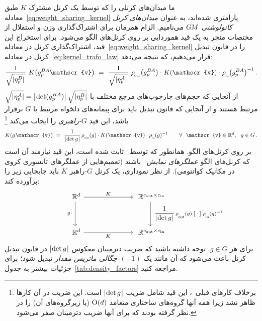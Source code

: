 ما میدان‌های کرنلی را که توسط یک کرنل مشترک $K$ طبق معادله~\eqref{eq:weight_sharing_kernel} پارامتری شده‌اند، به عنوان \emph{میدان‌های کرنل کانولوشنی} $G\mkern-1.4muM$ می‌نامیم.
الزام همزمان برای اشتراک‌گذاری وزن و استقلال از مختصات منجر به یک قید هموردایی بر روی کرنل‌های الگو می‌شود.
برای استخراج این قید، اشتراک‌گذاری کرنل در معادله~\eqref{eq:weight_sharing_kernel} را در قانون تبدیل کرنل در معادله~\eqref{eq:kernel_trafo_law} قرار می‌دهیم، که نتیجه می‌دهد:
\begin{align}
	\frac{1}{\sqrt{|\eta_p^B|\,}}\ K\big(g_p^{BA} \mathscr{v}\big)
	\ =\ 
	\frac{1}{\sqrt{|\eta_p^A|\,}}\ 
	\rhoout\big(g_p^{BA}\big) \cdot\mkern1mu 
	K(\mathscr{v})
	\mkern1mu\cdot \rhoin\big(g_p^{BA}\big)^{-1} \,.
\end{align}
از آنجایی که حجم‌های چارچوب‌های مرجع مختلف با
$\sqrt{|\eta_p^A|} = \big|\mkern-2mu \det(g_p^{BA})\big|\, \sqrt{|\eta_p^B|}$
مرتبط هستند و از آنجایی که قانون تبدیل باید برای پیمانه‌های دلخواه مرتبط با $G$ برقرار باشد، این قید \emph{$G$-راهبری} را ایجاب می‌کند%
\footnote{
	برخلاف کارهای قبلی~\cite{3d_steerableCNNs,Weiler2019_E2CNN,gaugeIco2019,kicanaoglu2019gaugeSphere,deHaan2020meshCNNs}، این قید شامل ضریب $|\mkern-2mu \det g \mkern1mu|$ است.
	این ضریب در آن کارها ظاهر نشد زیرا همه آنها گروه‌های ساختاری متعامد $\operatorname{O}(d)$ (یا زیرگروه‌های آن) را در نظر گرفته بودند که برای آنها ضریب دترمینان صفر می‌شود.
}
\begin{align}\label{eq:kernel_constraint}
	K(g\mkern1.5mu \mathscr{v})\ = \ \frac{1}{\detg}\, \rhoout(g) \cdot K(\mathscr{v}) \cdot \rhoin(g)^{-1}
	\qquad \forall\ \ \mathscr{v} \in \R^d,\ \ g\in G \,.
\end{align}
بر روی کرنل‌های الگو.
همانطور که توسط~\citet{lang2020WignerEckart} ثابت شده است، این قید نیازمند آن است که کرنل‌های الگو \emph{عملگرهای نمایش}~\cite{jeevanjee2011reprOp} باشند (تعمیم‌هایی از عملگرهای تانسوری کروی در مکانیک کوانتومی).
از نظر نموداری، یک کرنل $G$-راهبر $K$ باید جابجایی زیر را برآورده کند:
\begin{equation}\label{cd:kernel_steerability}
	\qquad\qquad
	\begin{tikzcd}[column sep=70pt, row sep=35pt, font=\normalsize]
		\R^d
		\arrow[d, "g\mkern2mu \cdot\,"']
		\arrow[r, "K"]
		&
		\R^{\cout\times\cin}
		\arrow[d, "\ \scalebox{.96}{$\displaystyle \frac{1}{\detg}$}\, \rhoout(g) \; \scalebox{1.1}{$[\,\cdot\,]$} \; \rhoin(g)^{-1}"]
		\\
		\R^d
		\arrow[r, "K"']
		&
		\R^{\cout\times\cin}
	\end{tikzcd}
\end{equation}
برای هر $g\in G$.
توجه داشته باشید که ضریب دترمینان معکوس $|\mkern-2mu \det g \mkern1mu|$ در قانون تبدیل کرنل باعث می‌شود که آن مانند یک \emph{$(-1)$-چگالی ماتریس-مقدار} تبدیل شود؛ برای جزئیات بیشتر به جدول~\ref{tab:density_factors} مراجعه کنید.
